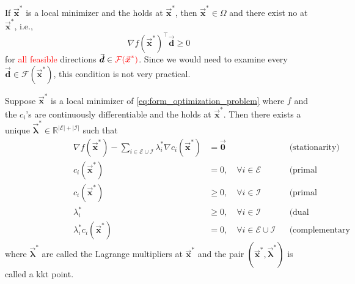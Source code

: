 \documentclass[9pt, headings=standardclasses, parskip=half]{scrartcl}
\renewcommand{\emph}[1]{\textcolor{mypurple}{#1}}
\newcommand{\vect}[1]{\vec{\boldsymbol{#1}}}
\newcommand{\R}{\mathbb{R}}
\begin{document}
\begin{lemma}\label{lem:fundamental_condition}
  If \(\vect{x}^{\ast}\) is a local minimizer and the  holds at \(\vect{x}^{\ast}\), then \(\vect{x}^{\ast} \in \Omega\) and there exist no  at $\vect{x}^*$, i.e.,
  \[
    \nabla f(\vect{x}^{\ast})^{\top} \vect{d} \ge 0
  \]
  for \textcolor{red}{all feasible} directions \(\vect{d}\in\textcolor{red}{\mathcal{F}(\vect{x}^{\ast})}\).
  Since we would need to examine every \(\vect{d}\in\mathcal{F}(\vect{x}^{\ast})\), this condition is not very practical.
\end{lemma}

\begin{theorem}\label{thm:KKT}
Suppose \(\vect{x}^{\ast}\) is a local minimizer of \eqref{eq:form_optimization_problem} where \(f\) and the \(c_i\)'s are continuously differentiable and the  holds at \(\vect{x}^{\ast}\). 
Then there exists a unique \(\vect{\lambda}^{\ast}\in\R^{|\mathcal{E}|+|\mathcal{I}|}\) such that
\begin{subequations}\label{eq:KKT}
  \begin{align}
    &\qquad\qquad\qquad&\nabla f(\vect{x}^{\ast}) - \sum_{i\in\mathcal{E}\cup\mathcal{I}} \lambda_{i}^{\ast} \nabla c_{i}(\vect{x}^{\ast}) &= \vect{0}   &&\text{(stationarity)} \label{eq:KKT_stationarity} \\ %
    &\qquad\qquad\qquad&c_{i}(\vect{x}^{\ast}) &= 0,                      \quad \forall i\in\mathcal{E}                             &&\text{(primal feasibility)}                \label{eq:KKT_equal_feas} \\
    &\qquad\qquad\qquad&c_{i}(\vect{x}^{\ast}) &\ge 0,                    \quad \forall i\in\mathcal{I}                             &&\text{(primal feasibility)}                \label{eq:KKT_inequal_feas} \\
    &\qquad\qquad\qquad&\lambda_{i}^{\ast} &\ge 0,                        \quad \forall i\in\mathcal{I}                             &&\text{(dual feasibility)}                  \label{eq:KKT_dual_feas} \\
    &\qquad\qquad\qquad&\lambda_{i}^{\ast} c_{i}(\vect{x}^{\ast}) &= 0,   \quad \forall i\in\mathcal{E}\cup\mathcal{I}              &&\text{(complementary slackness)}           \label{eq:KKT_comp_slack} %
  \end{align}
\end{subequations}
where \(\vect{\lambda}^{\ast}\) are called the \emph{Lagrange multipliers} at \(\vect{x}^{\ast}\) and the pair \((\vect{x}^{\ast},\vect{\lambda}^{\ast})\) is called a \gls{kkt} point.
\end{theorem}
\end{document}
